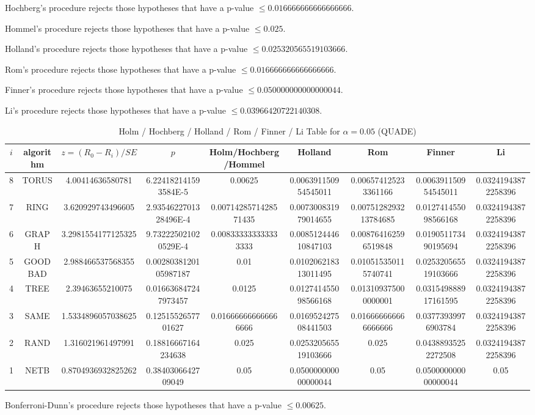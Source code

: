 \documentclass[a4paper,10pt]{article}
\begin{document}
\begin{landscape}
Hochberg's procedure rejects those hypotheses that have a p-value $\le0.016666666666666666$.


Hommel's procedure rejects those hypotheses that have a p-value $\le0.025$.


Holland's procedure rejects those hypotheses that have a p-value $\le0.025320565519103666$.


Rom's procedure rejects those hypotheses that have a p-value $\le0.016666666666666666$.


Finner's procedure rejects those hypotheses that have a p-value $\le0.050000000000000044$.


Li's procedure rejects those hypotheses that have a p-value $\le0.03966420722140308$.



\newpage

\begin{table}[!htp]
\centering\scriptsize
\caption{Holm / Hochberg / Holland / Rom / Finner / Li Table for $\alpha=0.05$ (QUADE)}
\begin{tabular}{ccccccccc}
$i$&algorithm&$z=(R_0 - R_i)/SE$&$p$&Holm/Hochberg/Hommel&Holland&Rom&Finner&Li\\
\hline
8& TORUS&4.00414636580781&6.224182141593584E-5&0.00625&0.006391150954545011&0.006574125233361166&0.006391150954545011&0.03241943872258396\\
7& RING&3.620929743496605&2.9354622701328496E-4&0.0071428571428571435&0.007300831979014655&0.0075128293213784685&0.012741455098566168&0.03241943872258396\\
6& GRAPH&3.2981554177125325&9.732225021020529E-4&0.008333333333333333&0.008512444610847103&0.008764162596519848&0.019051173490195694&0.03241943872258396\\
5& GOODBAD&2.988466537568355&0.0028038120105987187&0.01&0.010206218313011495&0.010515350115740741&0.025320565519103666&0.03241943872258396\\
4& TREE&2.39463655210075&0.016636847247973457&0.0125&0.012741455098566168&0.013109375000000001&0.031549888917161595&0.03241943872258396\\
3& SAME&1.5334896057038625&0.1251552657701627&0.016666666666666666&0.016952427508441503&0.016666666666666666&0.03773939976903784&0.03241943872258396\\
2& RAND&1.316021961497991&0.18816667164234638&0.025&0.025320565519103666&0.025&0.04388935252272508&0.03241943872258396\\
1& NETB&0.8704936932825262&0.3840306642709049&0.05&0.050000000000000044&0.05&0.050000000000000044&0.05\\
\hline
\end{tabular}
\end{table}
Bonferroni-Dunn's procedure rejects those hypotheses that have a p-value $\le0.00625$.



\end{landscape}
\end{document}

